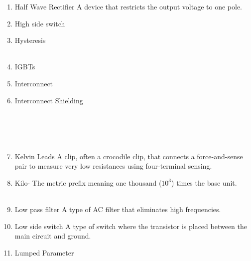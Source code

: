 \documentclass{IEEEtran}
\begin{document}
\begin{enumerate}
\\
\item Half Wave Rectifier
  \subitem A device that restricts the output voltage to one pole.\\
\item High side switch
  \subitem \\
\item Hysteresis
  \subitem \\

\\
\item IGBTs
\item Interconnect
  \subitem \\
\item Interconnect Shielding
\subitem \\
\\

\\
\\

\\
\item Kelvin Leads
\subitem A clip, often a crocodile clip, that connects a force-and-sense pair to measure very low resistances using four-terminal sensing.\\ 
\item Kilo-
  \subitem The metric prefix meaning one thousand ($10^{3}$) times the base unit.\\

\\
\item Low pass filter
  \subitem A type of AC filter that eliminates high frequencies.\\
\item Low side switch
  \subitem A type of switch where the transistor is placed between the main circuit and ground.\\
\item Lumped Parameter
  \subitem \\ 
\\



\end{enumerate}
\end{document}
